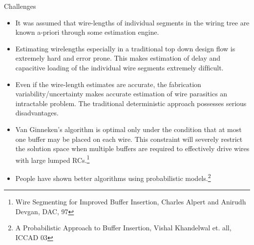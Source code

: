 \documentclass[10pt,sans,serif,trans]{beamer}
\begin{document}
\begin{frame}{Challenges}
   \begin{itemize}
      \item It was assumed that wire-lengths of individual segments in the wiring tree are known
a-priori through some estimation engine. 
\item Estimating wirelengths especially in a traditional top down design ﬂow is extremely hard and
error prone. This makes estimation of delay and capacitive loading of
the individual wire segments extremely difﬁcult. 
\item Even if the wire-length estimates are accurate, the fabrication variability/uncertainty
makes accurate estimation of wire parasitics an intractable problem. The traditional
deterministic approach possesses serious disadvantages.
\item Van Ginneken’s algorithm is optimal only under the condition that at most one
buffer may be placed on each wire. This constraint will severely restrict the solution space when
multiple buffers are required to effectively drive wires with large lumped RCs.\footnote{Wire
Segmenting for Improved Buffer Insertion, Charles Alpert and Anirudh Devgan, DAC, 97}
\item People have shown better algorithms
using probabilistic models.\footnote{A Probabilistic Approach to Buffer Insertion, Vishal Khandelwal
et. all, ICCAD 03}
\end{itemize}
\end{frame}
\end{document}
